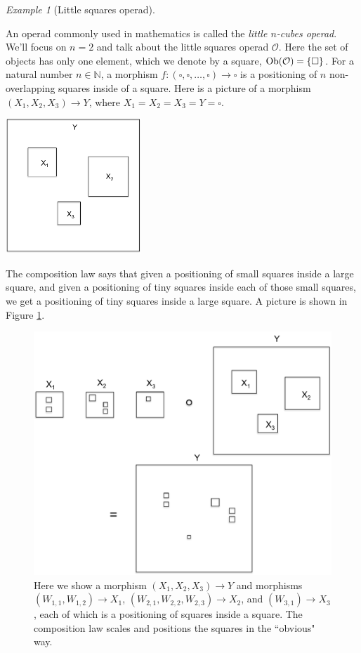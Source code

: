 \documentclass{book}
\def\tn{\textnormal}
\def\mc{\mathcal}
\def\NN{{\mathbb N}}
\def\Ob{\tn{Ob}}
\def\to{\rightarrow}
\def\taking{\colon}
\def\too{\longrightarrow}
\def\mcO{\mc{O}}
\theoremstyle{remark}
\newtheorem{example}[subsubsection]{Example}
\theoremstyle{definition}
\begin{document}
\begin{example}[Little squares operad]\label{ex:little squares}

An operad commonly used in mathematics is called the {\em little $n$-cubes operad}. We'll focus on $n=2$ and talk about the little squares operad $\mcO$. Here the set of objects has only one element, which we denote by a square, $\Ob(\mcO)=\{\square\}$. For a natural number $n\in\NN$, a morphism $f\taking(\square,\square,\ldots,\square)\too\square$ is a positioning of $n$ non-overlapping squares inside of a square. Here is a picture of a morphism $(X_1,X_2,X_3)\to Y$, where $X_1=X_2=X_3=Y=\square$.
\begin{center}
\includegraphics[height=2in]{square1}
\end{center}
The composition law says that given a positioning of small squares inside a large square, and given a positioning of tiny squares inside each of those small squares, we get a positioning of tiny squares inside a large square. A picture is shown in Figure \ref{fig:composition law for squares}.
\begin{figure}[H]
\begin{center}
\includegraphics[width=\textwidth]{square2}
\end{center}
\caption{Here we show a morphism $(X_1,X_2,X_3)\to Y$ and morphisms $(W_{1,1},W_{1,2})\to X_1$, $(W_{2,1},W_{2,2},W_{2,3})\to X_2$, and $(W_{3,1})\to X_3$, each of which is a positioning of squares inside a square. The composition law scales and positions the squares in the ``obvious" way.}
\label{fig:composition law for squares}
\end{figure}


\end{example}
\end{document}
